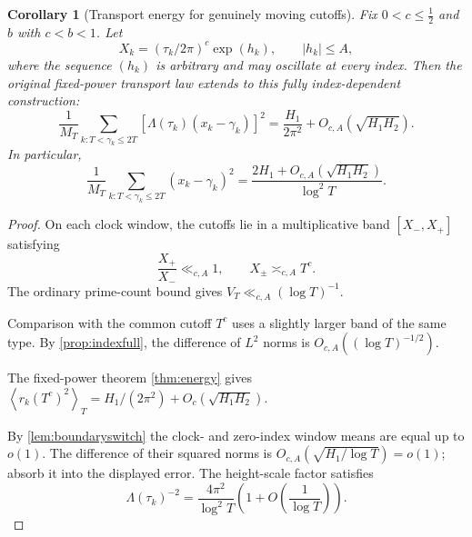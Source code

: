 \documentclass[11pt,reqno]{amsart}
\numberwithin{equation}{section}
\newtheorem{corollary}[theorem]{Corollary}
\newcommand{\av}[1]{\left\langle #1\right\rangle_T}
\newcommand{\lamb}{\Lambda}
\begin{document}
\begin{corollary}[Transport energy for genuinely moving cutoffs]\label{cor:indexenergyfixed}
Fix $0<c\le\frac12$ and $b$ with $c<b<1$. Let
\begin{equation}\label{eq:indexcutoff}
X_k=(\tau_k/2\pi)^c\exp(h_k),\qquad |h_k|\le A,
\end{equation}
where the sequence $(h_k)$ is arbitrary and may oscillate at every
index. Then the original fixed-power transport law extends to
this fully index-dependent construction:
\begin{equation}\label{eq:indexenergyfixed}
\frac1{M_T}\sum_{k:T<\gamma_k\le2T}
[\lamb(\tau_k)(x_k-\gamma_k)]^2
=\frac{H_1}{2\pi^2}+O_{c,A}(\sqrt{H_1H_2}).
\end{equation}
In particular,
\begin{equation}\label{eq:indexdistancefixed}
\frac1{M_T}\sum_{k:T<\gamma_k\le2T}(x_k-\gamma_k)^2
=\frac{2H_1+O_{c,A}(\sqrt{H_1H_2})}{\log^2T}.
\end{equation}
\end{corollary}
\begin{proof}
On each clock window, the cutoffs lie in a multiplicative band
$[X_-,X_+]$ satisfying
\[
\frac{X_+}{X_-}\ll_{c,A}1,\qquad X_\pm\asymp_{c,A}T^c.
\]
The ordinary prime-count bound gives
$V_T\ll_{c,A}(\log T)^{-1}$.

Comparison with the common cutoff $T^c$ uses a slightly larger
band of the same type. By
\cref{prop:indexfull}, the difference of $L^2$ norms is
$O_{c,A}((\log T)^{-1/2})$.

The fixed-power theorem \cref{thm:energy} gives
$\av{r_k(T^c)^2}=H_1/(2\pi^2)+O_c(\sqrt{H_1H_2})$.

By \cref{lem:boundaryswitch} the clock- and zero-index window means
are equal up to $o(1)$. The difference of their squared norms is
$O_{c,A}(\sqrt{H_1/\log T})=o(1)$; absorb it into the displayed
error. The height-scale factor satisfies
\begin{equation*}
\lamb(\tau_k)^{-2}
=\frac{4\pi^2}{\log^2T}
\left(1+O\left(\frac1{\log T}\right)\right).
\end{equation*}
\end{proof}
\end{document}
